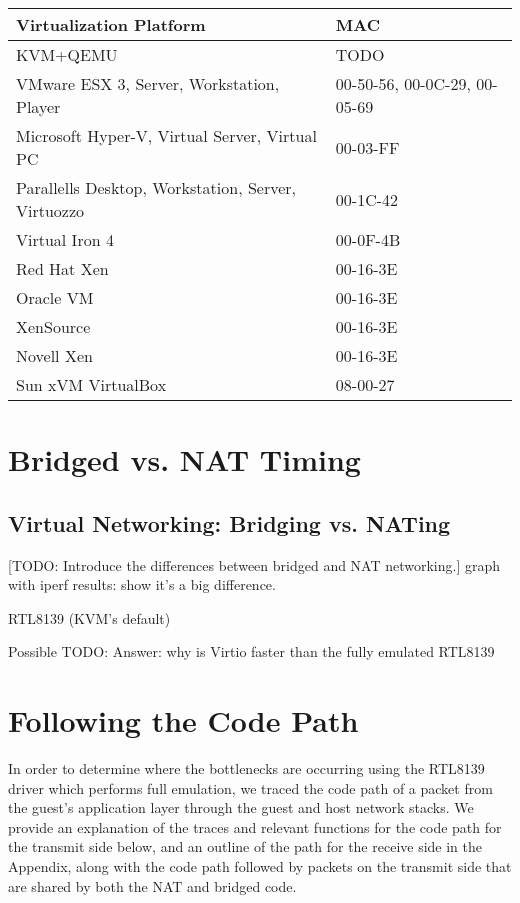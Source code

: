 \documentclass[11pt,pdftex,twocolumn]{article}
\begin{document}
\begin{center}
\begin{table*}[ht]
		\center
		\begin{tabular}{|l|l|}
		\hline
			Virtualization Platform & MAC \\
		\hline
		\hline
			KVM+QEMU & TODO \\
			VMware ESX 3, Server, Workstation, Player	& 00-50-56, 00-0C-29, 00-05-69 \\
			Microsoft Hyper-V, Virtual Server, Virtual PC	& 00-03-FF \\
			Parallells Desktop, Workstation, Server, Virtuozzo & 00-1C-42 \\
			Virtual Iron 4 & 00-0F-4B \\
			Red Hat Xen	& 00-16-3E \\
			Oracle VM	& 00-16-3E \\
			XenSource	& 00-16-3E \\
			Novell Xen & 00-16-3E \\
			Sun xVM VirtualBox & 08-00-27 \\
		\hline
		\end{tabular}
	\caption{First three octets of default MAC addresses by virtualization platform\footnote{ \emph{(Source:http://www.techrepublic.com/blog/networking/mac-address-scorecard-for-common-virtual-machine-platforms/538)}}}
	\label{tab:macaddrs}
\end{table*}
\end{center}

\section{Bridged vs. NAT Timing}
\label{sec:NFSTiming}	

\subsection{Virtual Networking: Bridging vs. NATing}
\label{subsec:bridgeVsNAT}
[TODO: Introduce the differences between bridged and NAT networking.]
graph with iperf results: show it's a big difference.

RTL8139 (KVM's default)

Possible TODO: Answer: why is Virtio faster than the fully emulated RTL8139

\section{Following the Code Path}
In order to determine where the bottlenecks are occurring using the RTL8139 driver which performs full emulation, we traced the code path of a packet from the guest's application layer through the guest and host network stacks. We provide an explanation of the traces and relevant functions for the code path for the transmit side below, and an outline of the path for the receive side in the Appendix, along with the code path followed by packets on the transmit side that are shared by both the NAT and bridged code. 
\end{document}
